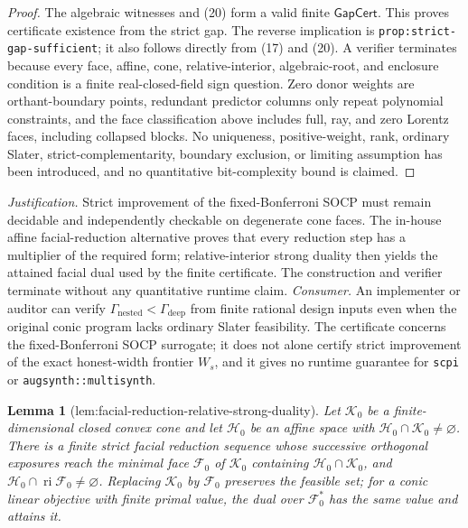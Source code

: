 \documentclass{article}
\newtheorem{lemma}{Lemma}
\begin{document}
\begin{proof}
The algebraic witnesses and (20) form a valid finite \(\mathsf{GapCert}\).  This proves certificate existence from the strict gap.  The reverse implication is \texttt{prop:strict-gap-sufficient}; it also follows directly from (17) and (20).  A verifier terminates because every face, affine, cone, relative-interior, algebraic-root, and enclosure condition is a finite real-closed-field sign question.  Zero donor weights are orthant-boundary points, redundant predictor columns only repeat polynomial constraints, and the face classification above includes full, ray, and zero Lorentz faces, including collapsed blocks.  No uniqueness, positive-weight, rank, ordinary Slater, strict-complementarity, boundary exclusion, or limiting assumption has been introduced, and no quantitative bit-complexity bound is claimed.
\end{proof}
\par\smallskip\noindent \textit{Justification.} Strict improvement of the fixed-Bonferroni SOCP must remain decidable and independently checkable on degenerate cone faces. The in-house affine facial-reduction alternative proves that every reduction step has a multiplier of the required form; relative-interior strong duality then yields the attained facial dual used by the finite certificate. The construction and verifier terminate without any quantitative runtime claim. \textit{Consumer.} An implementer or auditor can verify \(\Gamma_{\mathrm{nested}}<\Gamma_{\mathrm{deep}}\) from finite rational design inputs even when the original conic program lacks ordinary Slater feasibility. The certificate concerns the fixed-Bonferroni SOCP surrogate; it does not alone certify strict improvement of the exact honest-width frontier \(W_s\), and it gives no runtime guarantee for \texttt{scpi} or \texttt{augsynth::multisynth}.

\begin{lemma}[lem:facial-reduction-relative-strong-duality]\label{lem:facial-reduction-relative-strong-duality}
Let \(\mathcal K_0\) be a finite-dimensional closed convex cone and let
\(\mathcal H_0\) be an affine space with
\(\mathcal H_0\cap\mathcal K_0\ne\varnothing\).  There is a finite strict facial
reduction sequence whose successive orthogonal exposures reach the minimal
face \(\mathcal F_0\) of \(\mathcal K_0\) containing
\(\mathcal H_0\cap\mathcal K_0\), and
\(\mathcal H_0\cap\operatorname{ri}\mathcal F_0\ne\varnothing\).  Replacing
\(\mathcal K_0\) by \(\mathcal F_0\) preserves
the feasible set; for a conic linear objective with finite primal value, the
dual over \(\mathcal F_0^*\) has the same value and attains it.
\end{lemma}
\end{document}

